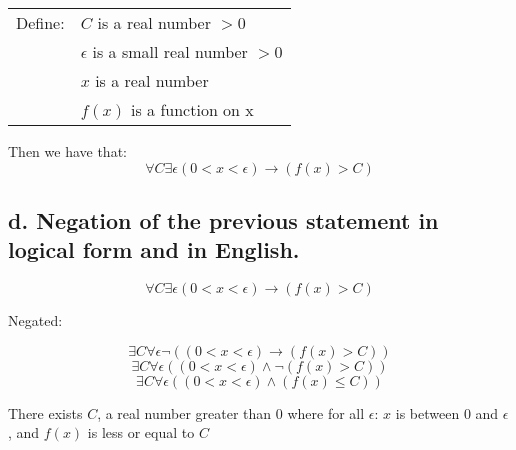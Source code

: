 \documentclass{article}
\begin{document}
\begin{tabular}{rl}
    Define: & $C$ is a real number $> 0$ \\
    & $\epsilon$ is a small real number $>0$\\
    & $x$ is a real number \\
    & $f(x)$ is a function on x
\end{tabular}

Then we have that:
$$ \forall C \exists \epsilon (0 < x < \epsilon) \rightarrow (f(x) > C)$$ 

\subsection*{d. Negation of the previous statement in logical form and in English.}
$$ \forall C \exists \epsilon (0 < x < \epsilon) \rightarrow (f(x) > C)$$ 

Negated:

$$ \exists C \forall \epsilon \neg ((0 < x < \epsilon) \rightarrow (f(x) > C))$$ 
$$ \exists C \forall \epsilon ((0 < x < \epsilon) \land \neg (f(x) > C))$$
$$ \exists C \forall \epsilon ((0 < x < \epsilon) \land (f(x) \leq C))$$

There exists $C$, a real number greater than $0$ where for all $\epsilon$: $x$ is between $0$ and $\epsilon$, and  $f(x)$ is less or equal to $C$
\end{document}
